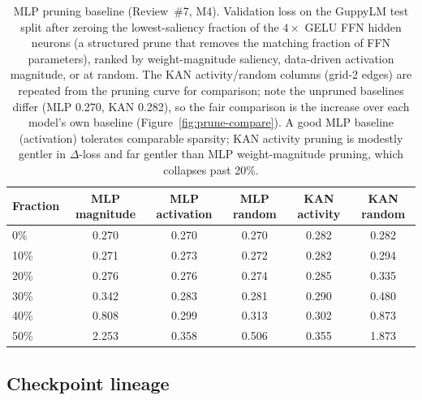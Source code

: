 \documentclass[11pt]{article}
\begin{document}
\begin{table}[htbp]
\centering
\caption{MLP pruning baseline (Review~\#7, M4). Validation loss on the GuppyLM test split after zeroing the lowest-saliency fraction of the \(4\times\) GELU FFN hidden neurons (a structured prune that removes the matching fraction of FFN parameters), ranked by weight-magnitude saliency, data-driven activation magnitude, or at random. The KAN activity/random columns (grid-2 edges) are repeated from the pruning curve for comparison; note the unpruned baselines differ (MLP 0.270, KAN 0.282), so the fair comparison is the increase over each model's own baseline (Figure~\ref{fig:prune-compare}). A good MLP baseline (activation) tolerates comparable sparsity; KAN activity pruning is modestly gentler in \(\Delta\)-loss and far gentler than MLP weight-magnitude pruning, which collapses past 20\%.}
\label{tab:prune-mlp}
\begin{tabular}{@{}lccccc@{}}
\toprule
Fraction & MLP magnitude & MLP activation & MLP random & KAN activity & KAN random \\
\midrule
0\%  & 0.270 & 0.270 & 0.270 & 0.282 & 0.282 \\
10\% & 0.271 & 0.273 & 0.272 & 0.282 & 0.294 \\
20\% & 0.276 & 0.276 & 0.274 & 0.285 & 0.335 \\
30\% & 0.342 & 0.283 & 0.281 & 0.290 & 0.480 \\
40\% & 0.808 & 0.299 & 0.313 & 0.302 & 0.873 \\
50\% & 2.253 & 0.358 & 0.506 & 0.355 & 1.873 \\
\bottomrule
\end{tabular}
\end{table}

\subsection{Checkpoint lineage}
\end{document}
